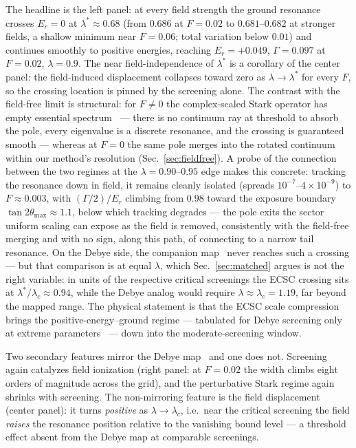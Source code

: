 \documentclass[aps,pre,twocolumn,superscriptaddress,floatfix,longbibliography]{revtex4-2}
\begin{document}
The headline is the left panel: at every field strength the ground
resonance crosses $E_r=0$ at $\lambda^{*}\approx0.68$ (from $0.686$
at $F=0.02$ to $0.681$--$0.682$ at stronger fields, a shallow
minimum near $F=0.06$; total variation below $0.01$) and continues
smoothly to positive energies, reaching $E_r=+0.049$,
$\Gamma=0.097$ at $F=0.02$, $\lambda=0.9$. The near
field-independence of $\lambda^{*}$ is a corollary of the center
panel: the field-induced displacement collapses toward zero as
$\lambda\to\lambda^{*}$ for every $F$, so the crossing location is
pinned by the screening alone. The contrast with the field-free
limit is structural: for $F\neq0$ the complex-scaled Stark operator
has empty essential spectrum~\cite{Herbst1979,HerbstSimon1978} ---
there is no continuum ray at threshold to absorb the pole, every
eigenvalue is a discrete resonance, and the crossing is guaranteed
smooth --- whereas at $F=0$ the same pole merges into the rotated
continuum within our method's resolution
(Sec.~\ref{sec:fieldfree}). A probe of the connection between the
two regimes at the $\lambda=0.90$--$0.95$ edge makes this concrete:
tracking the resonance down in field, it remains cleanly isolated
(spreads $10^{-7}$--$4\times10^{-9}$) to $F\approx0.003$, with
$(\Gamma/2)/E_r$ climbing from $0.98$ toward the exposure boundary
$\tan2\theta_{\max}\approx1.1$, below which tracking degrades ---
the pole exits the sector uniform scaling can expose as the field
is removed, consistently with the field-free merging and with no
sign, along this path, of connecting to a narrow tail resonance.
On the Debye side, the companion map~\cite{companionD} never
reaches such a crossing --- but that comparison is at equal
$\lambda$, which Sec.~\ref{sec:matched} argues is not the right
variable: in units of the respective critical screenings the ECSC
crossing sits at $\lambda^{*}/\lambda_c\approx0.94$, while the
Debye analog would require $\lambda\approx\lambda_c=1.19$, far
beyond the mapped range. The physical statement is that the ECSC
scale compression brings the positive-energy--ground regime ---
tabulated for Debye screening only at extreme
parameters~\cite{YuHo2005} --- down into the moderate-screening
window.

Two secondary features mirror the Debye map~\cite{companionD} and
one does not. Screening again catalyzes field ionization (right
panel: at $F=0.02$ the width climbs eight orders of magnitude
across the grid), and the perturbative Stark regime again shrinks
with screening. The non-mirroring feature is the field
displacement (center panel): it turns \emph{positive} as
$\lambda\to\lambda_c$, i.e.\ near the critical screening the field
\emph{raises} the resonance position relative to the vanishing
bound level --- a threshold effect absent from the Debye map at
comparable screenings.
\end{document}
